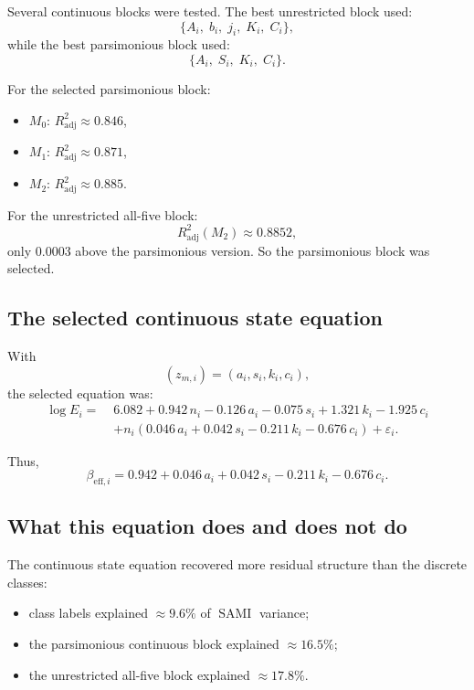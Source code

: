 \documentclass[11pt]{article}
\newcommand{\SAMI}{\operatorname{SAMI}}
\newcommand{\adjR}{R^2_{\mathrm{adj}}}
\begin{document}
Several continuous blocks were tested. The best unrestricted block used:
\begin{equation}
\{A_i,\; b_i,\; j_i,\; K_i,\; C_i\},
\end{equation}
while the best parsimonious block used:
\begin{equation}
\{A_i,\; S_i,\; K_i,\; C_i\}.
\end{equation}

For the selected parsimonious block:
\begin{itemize}
\item \(M_0\): \(\adjR \approx 0.846\),
\item \(M_1\): \(\adjR \approx 0.871\),
\item \(M_2\): \(\adjR \approx 0.885\).
\end{itemize}

For the unrestricted all-five block:
\begin{equation}
\adjR(M_2) \approx 0.8852,
\end{equation}
only \(0.0003\) above the parsimonious version. So the parsimonious block was selected.

\subsection{The selected continuous state equation}

With
\begin{equation}
(z_{m,i}) = (a_i,s_i,k_i,c_i),
\end{equation}
the selected equation was:
\begin{align}
\log E_i
=\;&
6.082
 + 0.942\,n_i
 - 0.126\,a_i
 - 0.075\,s_i
 + 1.321\,k_i
 - 1.925\,c_i
\nonumber\\
&+ n_i\left(
0.046\,a_i
 + 0.042\,s_i
 - 0.211\,k_i
 - 0.676\,c_i
\right)
 + \varepsilon_i.
\label{eq:selected-state}
\end{align}

Thus,
\begin{equation}
\beta_{\mathrm{eff},i}
=
0.942
 + 0.046\,a_i
 + 0.042\,s_i
 - 0.211\,k_i
 - 0.676\,c_i.
\label{eq:selected-beta-eff}
\end{equation}

\subsection{What this equation does and does not do}

The continuous state equation recovered more residual structure than the discrete classes:
\begin{itemize}
\item class labels explained \(\approx 9.6\%\) of \(\SAMI\) variance;
\item the parsimonious continuous block explained \(\approx 16.5\%\);
\item the unrestricted all-five block explained \(\approx 17.8\%\).
\end{itemize}
\end{document}
